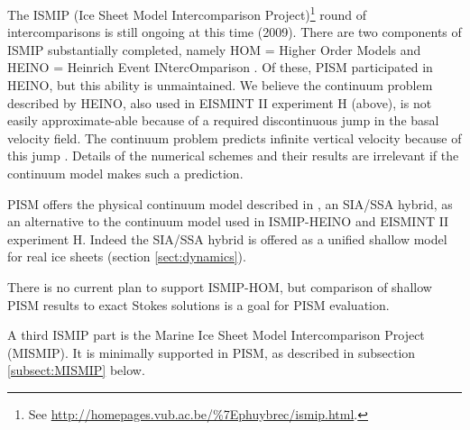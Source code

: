 \documentclass[11pt,final]{amsart}
\begin{document}
The ISMIP (Ice Sheet Model Intercomparison Project)\footnote{See \url{http://homepages.vub.ac.be/\%7Ephuybrec/ismip.html}.} round of intercomparisons is still ongoing at this time (2009).  There are two components of ISMIP substantially completed, namely HOM = Higher Order Models \cite{HOMtcd,HOMelmer} and HEINO = Heinrich Event INtercOmparison \cite{GreveTakahamaCalov}.  Of these, PISM participated in HEINO, but this ability is unmaintained.   We believe the continuum problem described by HEINO, also used in EISMINT II experiment H (above), is not easily approximate-able because of a required discontinuous jump in the basal velocity field.  The continuum problem predicts infinite vertical velocity because of this jump \cite[Appendix B]{BBssasliding}.  Details of the numerical schemes and their results are irrelevant if the continuum model makes such a prediction.

PISM offers the physical continuum model described in \cite{BBssasliding}, an SIA/SSA hybrid, as an alternative to the continuum model used in ISMIP-HEINO and EISMINT II experiment H.  Indeed the SIA/SSA hybrid is offered as a unified shallow model for real ice sheets (section \ref{sect:dynamics}).

There is no current plan to support ISMIP-HOM, but comparison of shallow PISM results to exact Stokes solutions is a goal for PISM evaluation.

A third ISMIP part is the Marine Ice Sheet Model Intercomparison Project (MISMIP).  It is minimally supported in PISM, as described in subsection \ref{subsect:MISMIP} below.
\end{document}
